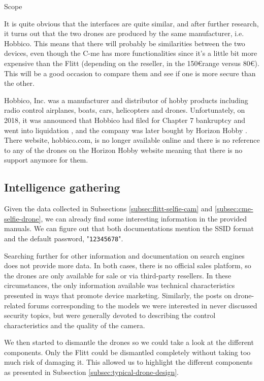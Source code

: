 \begin{chaptercover}{Scope}
\begin{tip}
It is quite obvious that the interfaces are quite similar, and after further research, it turns out that the two drones are produced by the same manufacturer, i.e. Hobbico. This means that there will probably be similarities between the two devices, even though the C-me has more functionalities since it’s a little bit more expensive than the Flitt (depending on the reseller, in the 150\euro range versus 80\euro). This will be a good occasion to compare them and see if one is more secure than the other.
\end{tip}

\begin{info}
Hobbico, Inc. was a manufacturer and distributor of hobby products including radio control airplanes, boats, cars, helicopters and drones. Unfortunately, on 2018, it was announced that Hobbico had filed for Chapter 7 bankruptcy and went into liquidation \cite{hobbico-liquidation}, and the company was later bought by Horizon Hobby \cite{horizon-hobby}. There website, hobbico.com, is no longer available online and there is no reference to any of the drones on the Horizon Hobby website meaning that there is no support anymore for them.
\end{info}

\subsection{Intelligence gathering}

Given the data collected in Subsections \ref{subsec:flitt-selfie-cam} and \ref{subsec:cme-selfie-drone}, we can already find some interesting information in the provided manuals. We can figure out that both documentations mention the SSID format and the default password, "\texttt{12345678}".

Searching further for other information and documentation on search engines does not provide more data. In both cases, there is no official sales platform, so the drones are only available for sale or via third-party resellers. In these circumstances, the only information available was technical characteristics presented in ways that promote device marketing. Similarly, the posts on drone-related forums corresponding to the models we were interested in never discussed security topics, but were generally devoted to describing the control characteristics and the quality of the camera.

We then started to dismantle the drones so we could take a look at the different components. Only the Flitt could be dismantled completely without taking too much risk of damaging it. This allowed us to highlight the different components as presented in Subsection \ref{subsec:typical-drone-design}.


\end{chaptercover}
